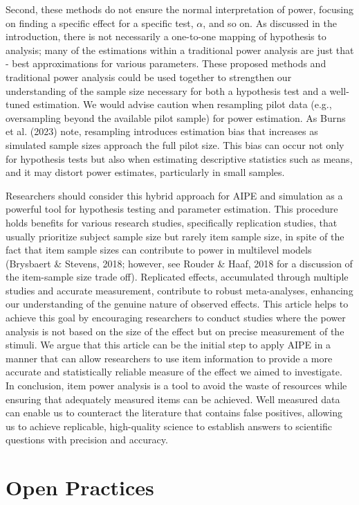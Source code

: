 \documentclass[
  man]{apa7}
\begin{document}
Second, these methods do not ensure the normal interpretation of power, focusing on finding a specific effect for a specific test, \(\alpha\), and so on. As discussed in the introduction, there is not necessarily a one-to-one mapping of hypothesis to analysis; many of the estimations within a traditional power analysis are just that - best approximations for various parameters. These proposed methods and traditional power analysis could be used together to strengthen our understanding of the sample size necessary for both a hypothesis test and a well-tuned estimation. We would advise caution when resampling pilot data (e.g., oversampling beyond the available pilot sample) for power estimation. As Burns et al. (2023) note, resampling introduces estimation bias that increases as simulated sample sizes approach the full pilot size. This bias can occur not only for hypothesis tests but also when estimating descriptive statistics such as means, and it may distort power estimates, particularly in small samples.

Researchers should consider this hybrid approach for AIPE and simulation as a powerful tool for hypothesis testing and parameter estimation. This procedure holds benefits for various research studies, specifically replication studies, that usually prioritize subject sample size but rarely item sample size, in spite of the fact that item sample sizes can contribute to power in multilevel models (Brysbaert \& Stevens, 2018; however, see Rouder \& Haaf, 2018 for a discussion of the item-sample size trade off). Replicated effects, accumulated through multiple studies and accurate measurement, contribute to robust meta-analyses, enhancing our understanding of the genuine nature of observed effects. This article helps to achieve this goal by encouraging researchers to conduct studies where the power analysis is not based on the size of the effect but on precise measurement of the stimuli. We argue that this article can be the initial step to apply AIPE in a manner that can allow researchers to use item information to provide a more accurate and statistically reliable measure of the effect we aimed to investigate. In conclusion, item power analysis is a tool to avoid the waste of resources while ensuring that adequately measured items can be achieved. Well measured data can enable us to counteract the literature that contains false positives, allowing us to achieve replicable, high-quality science to establish answers to scientific questions with precision and accuracy.

\section{Open Practices}\label{open-practices}
\end{document}
